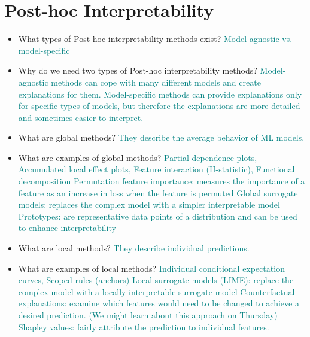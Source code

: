 \documentclass{report}
\newcommand{\asw}[2][teal]{}
\renewcommand{\asw}[2][teal]{\textcolor{#1}{#2}}
\begin{document}
	\section{Post-hoc Interpretability}
	
	\begin{itemize}
	\item What types of Post-hoc interpretability methods exist?
	\asw{\newline Model-agnostic vs. model-specific}
	\item Why do we need two types of Post-hoc interpretability methods?
	\asw{\newline Model-agnostic methods can cope with many different models and create explanations for them. Model-specific methods can provide explanations only for specific types of models, but therefore the explanations are more detailed and sometimes easier to interpret.}
	\item What are global methods?
	\asw{\newline They describe the average behavior of ML models.}
	\item What are examples of global methods?
	\asw{\newline Partial dependence plots, Accumulated local effect plots, Feature interaction (H-statistic), Functional decomposition
		\newline Permutation feature importance: measures the importance of a feature as an increase in loss when the feature is permuted
		\newline Global surrogate models: replaces the complex model with a simpler interpretable model
		\newline Prototypes: are representative data points of a distribution and can be used to enhance interpretability}
	\item What are local methods?
	\asw{\newline They describe individual predictions.}
	\item What are examples of local methods?
	\asw{\newline Individual conditional expectation curves, Scoped rules (anchors)
		\newline Local surrogate models (LIME): replace the complex model with a locally interpretable surrogate
		model
		\newline Counterfactual explanations: examine which features would need to be changed to achieve a desired prediction. (We might learn about this approach on Thursday)
		\newline Shapley values: fairly attribute the prediction to individual features.
}
\end{itemize}
\end{document}
